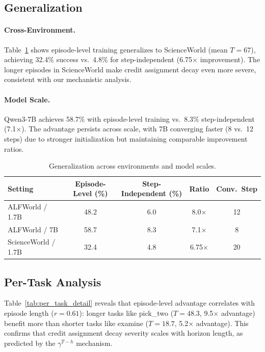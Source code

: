\documentclass[11pt]{article}
\begin{document}
\subsection{Generalization}

\paragraph{Cross-Environment.}
Table~\ref{tab:generalization} shows episode-level training generalizes to ScienceWorld (mean $T = 67$), achieving 32.4\% success vs.\ 4.8\% for step-independent (6.75$\times$ improvement). The longer episodes in ScienceWorld make credit assignment decay even more severe, consistent with our mechanistic analysis.

\paragraph{Model Scale.}
Qwen3-7B achieves 58.7\% with episode-level training vs.\ 8.3\% step-independent (7.1$\times$). The advantage persists across scale, with 7B converging faster (8 vs.\ 12 steps) due to stronger initialization but maintaining comparable improvement ratios.

\begin{table}[h]
\centering
\caption{Generalization across environments and model scales.}
\label{tab:generalization}
\begin{tabular}{lcccc}
\toprule
Setting & Episode-Level (\%) & Step-Independent (\%) & Ratio & Conv.\ Step \\
\midrule
ALFWorld / 1.7B & 48.2 & 6.0 & 8.0$\times$ & 12 \\
ALFWorld / 7B & 58.7 & 8.3 & 7.1$\times$ & 8 \\
ScienceWorld / 1.7B & 32.4 & 4.8 & 6.75$\times$ & 20 \\
\bottomrule
\end{tabular}
\end{table}

\subsection{Per-Task Analysis}

Table~\ref{tab:per_task_detail} reveals that episode-level advantage correlates with episode length ($r = 0.61$): longer tasks like pick\_two ($T = 48.3$, 9.5$\times$ advantage) benefit more than shorter tasks like examine ($T = 18.7$, 5.2$\times$ advantage). This confirms that credit assignment decay severity scales with horizon length, as predicted by the $\gamma^{T-h}$ mechanism.
\end{document}
